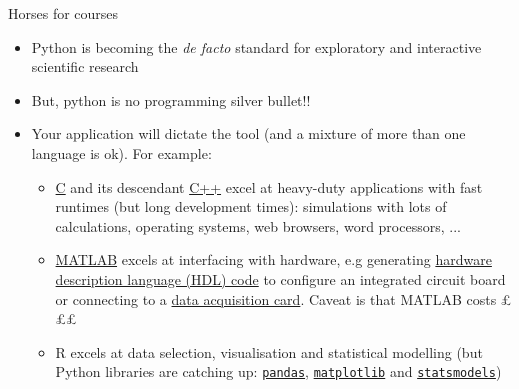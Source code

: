 \documentclass[xcolor=table,aspectratio=169]{beamer}
\begin{document}
\begin{frame}{Horses for courses}

\begin{itemize}\addtolength{\itemsep}{0.5\baselineskip}
        \item<1-> Python is becoming the \emph{de facto} standard for exploratory and interactive scientific research\\
	\item<2-> But, python is no programming silver bullet!!
	\item<3-> Your application will dictate the tool (and a mixture of more than one language is ok). For example:\\
	\begin{itemize}\addtolength{\itemsep}{0.8\baselineskip}
            \item<4-> \href{https://jsommers.github.io/cbook/index.html}{C} and its descendant \href{https://www.stroustrup.com/C++.html}{C++} excel at heavy-duty applications with fast runtimes (but long development times): simulations with lots of calculations, operating systems, web browsers, word processors, ...
            \item<5-> \href{https://uk.mathworks.com/help/matlab/}{MATLAB} excels at interfacing with hardware, e.g generating \href{https://uk.mathworks.com/products/hdl-coder.html}{hardware description language (HDL) code} to configure an integrated circuit board or connecting to a \href{https://uk.mathworks.com/products/daq.html}{data acquisition card}. Caveat is that MATLAB costs \pounds \pounds \pounds
            \item<6-> R excels at data selection, visualisation and statistical modelling (but Python libraries are catching up: \href{https://pandas.pydata.org/docs/user_guide/index.html}{\texttt{pandas}}, \href{https://matplotlib.org/}{\texttt{matplotlib}} and \href{https://www.statsmodels.org/stable/index.html}{\texttt{statsmodels}})
	\end{itemize}
\end{itemize}

\end{frame}
\end{document}

